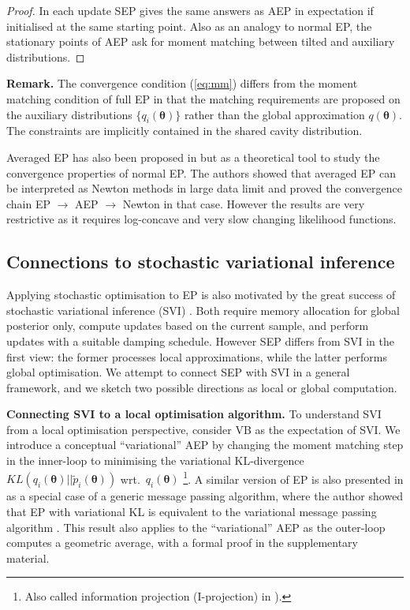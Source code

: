 \begin{proof}
In each update SEP gives the same answers as AEP in expectation if initialised at the same starting point. Also as an analogy to normal EP, the stationary points of AEP ask for moment matching between tilted and auxiliary distributions. 
\end{proof}
\textbf{Remark.} The convergence condition (\ref{eq:mm}) differs from the moment matching condition of full EP in that the matching requirements are proposed on the auxiliary distributions $\{q_i(\bm{\theta}) \}$ rather than the global approximation $q(\bm{\theta})$. The constraints are implicitly contained in the shared cavity distribution.

%
%
Averaged EP has also been proposed in \cite{barthelme:aep} but as a theoretical tool to study the convergence properties of normal EP. The authors showed that averaged EP can be interpreted as Newton methods in large data limit and proved the convergence chain EP $\rightarrow$ AEP $\rightarrow$ Newton in that case. However the results are very restrictive as it requires log-concave and very slow changing likelihood functions. 

\subsection{Connections to stochastic variational inference}
Applying stochastic optimisation to EP is also motivated by the great success of stochastic variational inference (SVI) \cite{hoffman:svi}. Both require memory allocation for global posterior only, compute updates based on the current sample, and perform updates with a suitable damping schedule. However SEP differs from SVI in the first view: the former processes local approximations, while the latter performs global optimisation. We attempt to connect SEP with SVI in a general framework, and we sketch two possible directions as local or global computation.

%
\textbf{Connecting SVI to a local optimisation algorithm.}
To understand SVI from a local optimisation perspective, consider VB as the expectation of SVI. We introduce a conceptual ``variational'' AEP by changing the moment matching step in the inner-loop to minimising the variational KL-divergence $KL(q_i(\bm{\theta}) || \tilde{p}_i(\bm{\theta}))$ wrt.~$q_i(\bm{\theta})$ \footnote{Also called information projection (I-projection) in \cite{amari:ig}).}. A similar version of EP is also presented in \cite{minka:divergence} as a special case of a generic message passing algorithm, where the author showed that EP with variational KL is equivalent to the variational message passing algorithm \cite{winn:vmp}. This result also applies to the ``variational'' AEP as the outer-loop computes a geometric average, with a formal proof in the supplementary material. 

